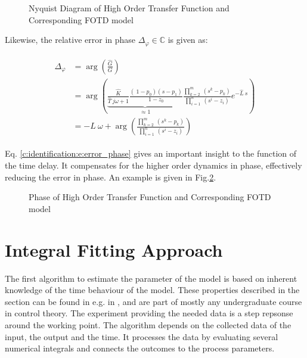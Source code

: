 \begin{figure}[H]
  \centering
  \def\svgwidth{\textwidth}
  
  \caption{Nyquist Diagram of High Order Transfer Function and Corresponding FOTD model}
  \label{c:identification:f:nyquist_fotd}
\end{figure}


Likewise, the relative error in phase $\Delta_\varphi \in \mathbb{C}$ is given as:

\begin{align}
\begin{split}
\Delta_\varphi &= \arg\left(\frac{\hat{G}}{G}\right) \\
&= \arg\left(\underbrace{\frac{\hat{K}}{\hat{T}~j\omega+1} \frac{\left(\ 1-p_0 \right)\left( s- p_1 \right)}{1-z_0}}_{\approx 1} \frac{\prod_{k=2}^m~(s^k-p_k)}{\prod_{i=1}^n~(s^i-z_i)}e^{-\hat{L}~s} \right)\\
&= -L~\omega + \arg\left(\frac{\prod_{k=2}^m~(s^k-p_k)}{\prod_{i=1}^n~(s^i-z_i)}\right)
\end{split}
\label{c:identification:e:error_phase}
\end{align}

Eq. \ref{c:identification:e:error_phase} gives an important insight to the function of the time delay. It compensates for the higher order dynamics in phase, effectively reducing the error in phase. An example is given in Fig.\ref{c:identification:f:phase_fotd}.\\

\begin{figure}[h!]
  \centering
  \def\svgwidth{\textwidth}
  
  \caption{Phase of High Order Transfer Function and Corresponding FOTD model}
  \label{c:identification:f:phase_fotd}
\end{figure}


\section{Integral Fitting Approach}
\label{c:identification:s:area}

The first algorithm to estimate the parameter of the model is based on inherent knowledge of the time behaviour of the model. These properties described in the section can be found in e.g. in \cite{Bi1999}, \cite{Fedele2009a} and are part of mostly any undergraduate course in control theory. The experiment providing the needed data is a step repsonse around the working point. The algorithm depends on the collected data of the input, the output and the time. It processes the data by evaluating several numerical integrals and connects the outcomes to the process parameters.\\

